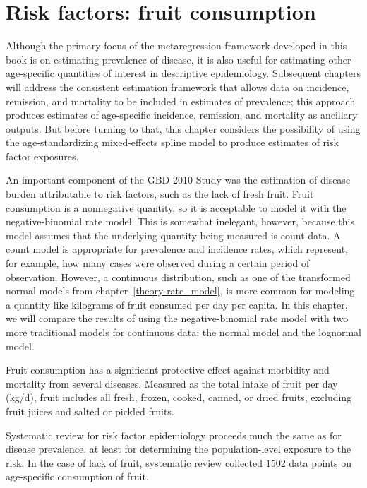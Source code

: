 \chapter{Risk factors: fruit consumption}
\label{applications-log_normal}
Although the primary focus of the metaregression framework developed
in this book is on estimating prevalence of disease, it is also
useful for estimating other age-specific quantities of interest in
descriptive epidemiology.  Subsequent chapters will address the
consistent estimation framework that allows data on incidence,
remission, and mortality to be included in estimates of prevalence;
this approach produces estimates of age-specific incidence, remission,
and mortality as ancillary outputs.  But before turning to that,
this chapter considers the possibility of using the
age-standardizing mixed-effects spline model to produce estimates of
risk factor exposures.

An important component of the GBD 2010 Study was the estimation of
disease burden attributable to risk factors, such as the lack of fresh
fruit.  Fruit consumption is a nonnegative quantity, so it is
acceptable to model it with the negative-binomial rate model.  This is
somewhat inelegant, however, because this model assumes that the
underlying quantity being measured is count data.  A count model is
appropriate for prevalence and incidence rates, which represent, for
example, how many cases were observed during a certain period of
observation.  However, a continuous distribution, such as one of the
transformed normal models from chapter~\ref{theory-rate_model}, is
more common for modeling a quantity like kilograms of fruit consumed
per day per capita.  In this chapter, we will compare the results of
using the negative-binomial rate model with two more traditional
models for continuous data: the normal model and the lognormal model.

Fruit consumption has a significant protective
effect against morbidity and mortality from several diseases.
Measured as the total intake of fruit per day (kg/d), fruit
includes all fresh, frozen, cooked, canned, or dried fruits, excluding
fruit juices and salted or pickled fruits. \cite{he_increased_2007,
  boeing_intake_2006}

Systematic review for
risk factor epidemiology proceeds much the same as for disease
prevalence, at least for determining the population-level exposure to
the risk.  In the case of lack of fruit, systematic review collected
$1502$ data points on age-specific consumption of fruit.

